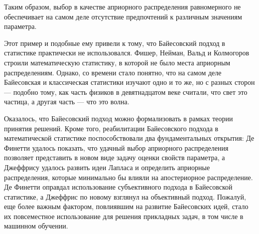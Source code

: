 Таким образом, выбор в качестве априорного распределения равномерного не обеспечивает на самом деле 
отсутствие предпочтений к различным значениям параметра.

Этот пример и подобные ему привели к тому, что Байесовский подход в статистике практически не использовался.
Фишер, Нейман, Вальд и Колмогоров строили математическую статистику, в которой не было места априорным распределениям.
Однако, со времени стало понятно, что на самом деле Байесовская и классическая статистики изучают одно и то же, 
но с разных сторон --- подобно тому, как часть физиков в девятнадцатом веке считали, что свет это частица,
а другая часть --- что это волна.

Оказалось, что Байесовский подход можно формализовать в рамках теории принятия решений.
Кроме того, реабилитации Байесовского подхода в математической статистике поспособствовали 
два фундаментальных открытия: 
Де Финетти удалось показать, что удачный выбор априорного распределения позволяет представить в новом виде задачу оценки свойств параметра, 
а Джеффрису удалось развить идеи Лапласа и определить априорные распределения, которые минимально бы влияли на апостериорное распределение.
Де Финетти оправдал использование субъективного подхода в Байесовской статистике, 
а Джеффрис по новому взглянул на объективный подход.
Пожалуй, еще более важным фактором, повлиявшим на развитие Байесовских идей, стало их повсеместное использование для решения прикладных задач,
в том числе в машинном обучении.


